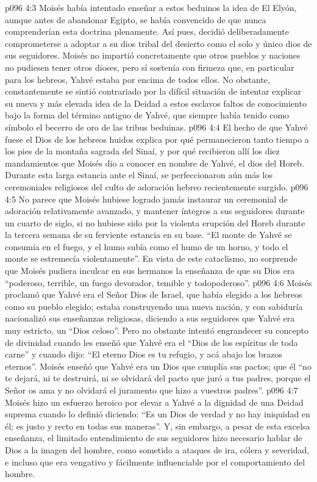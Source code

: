 \vs p096 4:3 Moisés había intentado enseñar a estos beduinos la idea de El Elyón, aunque antes de abandonar Egipto, se había convencido de que nunca comprenderían esta doctrina plenamente. Así pues, decidió deliberadamente comprometerse a adoptar a su dios tribal del desierto como el solo y único dios de sus seguidores. Moisés no impartió concretamente que otros pueblos y naciones no pudiesen tener otros dioses, pero sí sostenía con firmeza que, en particular para los hebreos, Yahvé estaba por encima de todos ellos. No obstante, constantemente se sintió contrariado por la difícil situación de intentar explicar su nueva y más elevada idea de la Deidad a estos esclavos faltos de conocimiento bajo la forma del término antiguo de Yahvé, que siempre había tenido como símbolo el becerro de oro de las tribus beduinas.
\vs p096 4:4 \pc El hecho de que Yahvé fuese el Dios de los hebreos huidos explica por qué permanecieron tanto tiempo a los pies de la montaña sagrada del Sinaí, y por qué recibieron allí los diez mandamientos que Moisés dio a conocer en nombre de Yahvé, el dios del Horeb. Durante esta larga estancia ante el Sinaí, se perfeccionaron aún más los ceremoniales religiosos del culto de adoración hebreo recientemente surgido.
\vs p096 4:5 \pc No parece que Moisés hubiese logrado jamás instaurar un ceremonial de adoración relativamente avanzado, y mantener íntegros a sus seguidores durante un cuarto de siglo, si no hubiese sido por la violenta erupción del Horeb durante la tercera semana de su ferviente estancia en su base. “El monte de Yahvé se consumía en el fuego, y el humo subía como el humo de un horno, y todo el monte se estremecía violentamente”. En vista de este cataclismo, no sorprende que Moisés pudiera inculcar en sus hermanos la enseñanza de que su Dios era “poderoso, terrible, un fuego devorador, temible y todopoderoso”.
\vs p096 4:6 Moisés proclamó que Yahvé era el Señor Dios de Israel, que había elegido a los hebreos como su pueblo elegido; estaba construyendo una nueva nación, y con sabiduría nacionalizó sus enseñanzas religiosas, diciendo a sus seguidores que Yahvé era muy estricto, un “Dios celoso”. Pero no obstante intentó engrandecer su concepto de divinidad cuando les enseñó que Yahvé era el “Dios de los espíritus de toda carne” y cuando dijo: “El eterno Dios es tu refugio, y acá abajo los brazos eternos”. Moisés enseñó que Yahvé era un Dios que cumplía sus pactos; que él “no te dejará, ni te destruirá, ni se olvidará del pacto que juró a tus padres, porque el Señor os ama y no olvidará el juramento que hizo a vuestros padres”.
\vs p096 4:7 Moisés hizo un esfuerzo heroico por elevar a Yahvé a la dignidad de una Deidad suprema cuando lo definió diciendo: “Es un Dios de verdad y no hay iniquidad en él; es justo y recto en todas sus maneras”. Y, sin embargo, a pesar de esta excelsa enseñanza, el limitado entendimiento de sus seguidores hizo necesario hablar de Dios a la imagen del hombre, como sometido a ataques de ira, cólera y severidad, e incluso que era vengativo y fácilmente influenciable por el comportamiento del hombre.

